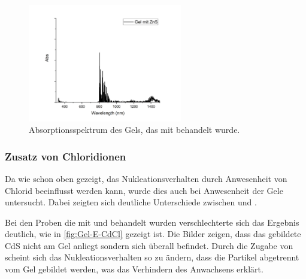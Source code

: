 		\begin{figure}[H]
			\centering
			\includegraphics[width=0.6\textwidth]{Bilder/UV-Gel-E-ZnS} 	
			\caption{Absorptionsspektrum des Gels, das mit  behandelt wurde.}
			\label{fig:UV-Gel-E-ZnS}
		\end{figure}
	
	\subsubsection{Zusatz von Chloridionen}
	
		Da wie schon oben gezeigt, das Nukleationsverhalten durch Anwesenheit von Chlorid beeinflusst werden kann, wurde dies auch bei Anwesenheit der Gele untersucht.
		Dabei zeigten sich deutliche Unterschiede zwischen  und .
		
		Bei den Proben die mit  und  behandelt wurden verschlechterte sich das Ergebnis deutlich, wie in \cref{fig:Gel-E-CdCl} gezeigt ist.
		Die Bilder zeigen, dass das gebildete CdS nicht am Gel anliegt sondern sich überall befindet.
		Durch die Zugabe von  scheint sich das Nukleationsverhalten so zu  ändern, dass die Partikel abgetrennt vom Gel gebildet werden, was das Verhindern des Anwachsens erklärt.  
		

